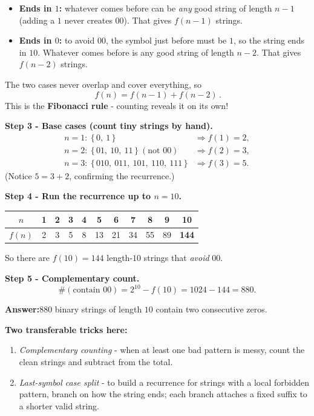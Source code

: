 \documentclass[11pt,a4paper]{article}
\newcommand{\answer}[1]{\begin{answerbox}\centering\textbf{Answer:}\quad #1\end{answerbox}}
\begin{document}
\begin{itemize}[leftmargin=1.4em,itemsep=1pt]
  \item \textbf{Ends in $1$:} whatever comes before can be \emph{any} good string of length
        $n-1$ (adding a $1$ never creates \textquotedbl{}$00$\textquotedbl{}). That gives $f(n-1)$ strings.
  \item \textbf{Ends in $0$:} to avoid \textquotedbl{}$00$\textquotedbl{}, the symbol just before must be $1$, so the
        string ends in \textquotedbl{}$10$\textquotedbl{}. Whatever comes before is any good string of length $n-2$.
        That gives $f(n-2)$ strings.
\end{itemize}
The two cases never overlap and cover everything, so
\[
\boxed{\,f(n) = f(n-1) + f(n-2)\,}.
\]
This is the \textbf{Fibonacci rule} - counting reveals it on its own!

\textbf{Step 3 - Base cases (count tiny strings by hand).}
\[
\begin{aligned}
n=1:\ \{\,0,\ 1\,\} &\Rightarrow f(1)=2,\\
n=2:\ \{\,01,\ 10,\ 11\,\}\ (\text{not } 00) &\Rightarrow f(2)=3,\\
n=3:\ \{\,010,\ 011,\ 101,\ 110,\ 111\,\} &\Rightarrow f(3)=5.
\end{aligned}
\]
(Notice $5=3+2$, confirming the recurrence.)

\textbf{Step 4 - Run the recurrence up to $n=10$.}
\begin{center}
\small
\begin{tabular}{@{}c|cccccccccc@{}}
\toprule
$n$    & 1 & 2 & 3 & 4 & 5 & 6 & 7 & 8 & 9 & 10\\
\midrule
$f(n)$ & 2 & 3 & 5 & 8 & 13 & 21 & 34 & 55 & 89 & \textbf{144}\\
\bottomrule
\end{tabular}
\end{center}
So there are $f(10)=144$ length-$10$ strings that \emph{avoid} \textquotedbl{}$00$\textquotedbl{}.

\textbf{Step 5 - Complementary count.}
\[
\#(\text{contain } 00) = 2^{10} - f(10) = 1024 - 144 = 880.
\]

\answer{$880$ binary strings of length $10$ contain two consecutive zeros.}

\begin{methodbox}
\textbf{Two transferable tricks here:}
\begin{enumerate}[leftmargin=1.5em,itemsep=1pt]
  \item \emph{Complementary counting} - when \textquotedbl{}at least one bad pattern\textquotedbl{} is messy, count the
        clean strings and subtract from the total.
  \item \emph{Last-symbol case split} - to build a recurrence for strings with a local
        forbidden pattern, branch on how the string ends; each branch attaches a fixed
        suffix to a shorter valid string.
\end{enumerate}
\end{methodbox}
\end{document}
